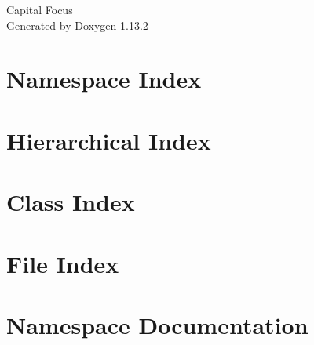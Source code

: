 \documentclass[twoside]{book}
\newcommand{\+}{\discretionary{\mbox{\scriptsize$\hookleftarrow$}}{}{}}
\newcommand{\clearemptydoublepage}{%
    \newpage{\pagestyle{empty}\cleardoublepage}%
  }
\begin{document}
  \raggedbottom
    \hypersetup{pageanchor=false,
                bookmarksnumbered=true,
                pdfencoding=unicode
               }
  \begin{titlepage}
  \vspace*{7cm}
  \begin{center}%
  {\Large Capital Focus}\\
  \vspace*{1cm}
  {\large Generated by Doxygen 1.13.2}\\
  \end{center}
  \end{titlepage}
  \clearemptydoublepage
  \tableofcontents
  \clearemptydoublepage
  \hypersetup{pageanchor=true}

\chapter{Namespace Index}

\chapter{Hierarchical Index}

\chapter{Class Index}

\chapter{File Index}

\chapter{Namespace Documentation}





\end{document}
